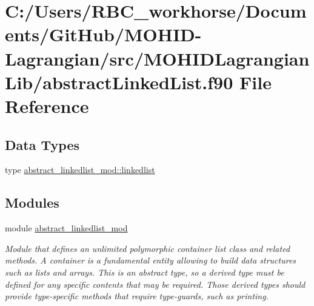 \hypertarget{abstract_linked_list_8f90}{}\section{C\+:/\+Users/\+R\+B\+C\+\_\+workhorse/\+Documents/\+Git\+Hub/\+M\+O\+H\+I\+D-\/\+Lagrangian/src/\+M\+O\+H\+I\+D\+Lagrangian\+Lib/abstract\+Linked\+List.f90 File Reference}
\label{abstract_linked_list_8f90}
\subsection*{Data Types}
\begin{DoxyCompactItemize}
\item 
type \mbox{\hyperlink{structabstract__linkedlist__mod_1_1linkedlist}{abstract\+\_\+linkedlist\+\_\+mod\+::linkedlist}}
\end{DoxyCompactItemize}
\subsection*{Modules}
\begin{DoxyCompactItemize}
\item 
module \mbox{\hyperlink{namespaceabstract__linkedlist__mod}{abstract\+\_\+linkedlist\+\_\+mod}}
\begin{DoxyCompactList}\small\item\em Module that defines an unlimited polymorphic container list class and related methods. A container is a fundamental entity allowing to build data structures such as lists and arrays. This is an abstract type, so a derived type must be defined for any specific contents that may be required. Those derived types should provide type-\/specific methods that require type-\/guards, such as printing. \end{DoxyCompactList}\end{DoxyCompactItemize}

